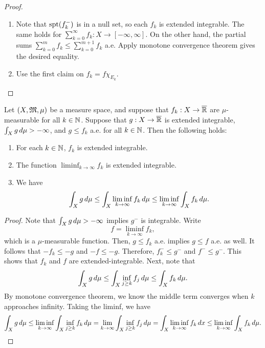 \documentclass[a4paper]{article}
\renewcommand{\suminfk}{\sum_{k=0}^\infty}
\renewcommand{\sumk}{\sum_{k=0}}
\begin{document}
\begin{proof}
\begin{enumerate}
  \item Note that $\operatorname{spt}(f_k^-)$ is in a null set, so each $f_k$ is
  extended integrable. The same holds for $\suminfk f_k :
  X \to [-\infty, \infty]$. On the other hand, the partial sums
  $\sumk^m f_k \leq \sumk^{m+1} f_k$ a.e. Apply monotone
  convergence theorem gives the desired equality.

  \item Use the first claim on $f_k = f \chi_{E_k}$.
\end{enumerate}
\end{proof}

\begin{thm}
Let $(X, \mathfrak{M}, \mu)$ be a measure space, and suppose
that $f_k : X \to \overline{\mathbb{R}}$ are $\mu$-measurable
for all $k \in \mathbb{N}$. Suppose that $g : X \to \overline{\mathbb{R}}$ is
extended integrable, $\int_X g \, d \mu > - \infty$, and
$g \leq f_k$ a.e. for all $k \in \mathbb{N}$. Then the following
holds:
\begin{enumerate}
\item For each $k \in \mathbb{N}$, $f_k$ is extended integrable.
\item The function $\liminf_{k \to \infty} f_k$
is extended integrable.
\item We have
\[
\int_X g \, d \mu \leq \int_X \liminf_{k \to \infty}
f_k \, d \mu \leq \liminf_{k \to \infty} \int_X f_k \, d \mu.
\]
\end{enumerate}
\end{thm}

\begin{proof}
Note that $\int_X g \, d \mu > - \infty$ implies $g^-$ is
integrable. Write
\[
  f = \liminf_{k \to \infty} f_k,
\]
which is
a $\mu$-measurable function. Then, $g \leq f_k$ a.e. implies
$g \leq f$ a.e. as well. It follows that $-f_k \leq -g$
and $-f \leq -g$. Therefore,
$f_k^- \leq g^-$ and $f^- \leq g^-$.
This shows that
$f_k$ and $f$ are extended-integrable. Next, note that
\[
\int_X g \, d \mu \leq \int_X \inf_{j \geq k} f_j \, d \mu
\leq \int_X f_k \, d \mu.
\]
By monotone convergence theorem, we know the middle term
converges when $k$ approaches infinity.
Taking the liminf, we have
\[
\int_X g \, d \mu
\leq
\liminf_{k \to \infty} \int_X \inf_{j \geq k} f_k \, d \mu
= \lim_{k \to \infty} \int_X \inf_{j \geq k} f_j \, d \mu
= \int_X \liminf_{k \to \infty} f_k \, d x
\leq \liminf_{k \to \infty} \int_X f_k \, d \mu.
\]
\end{proof}
\end{document}
